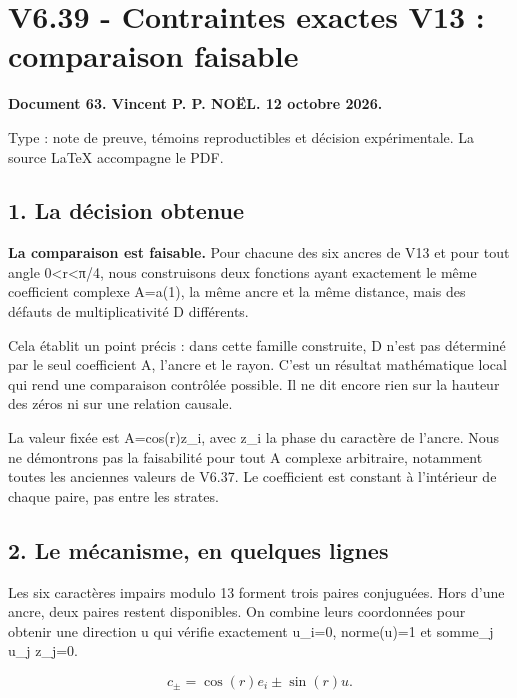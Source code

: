 \documentclass[
  10pt,
  a4paper,
]{article}
\author{}
\date{}
\begin{document}
\hypertarget{v6.39---contraintes-exactes-v13-comparaison-faisable}{%
\section{V6.39 - Contraintes exactes V13 : comparaison
faisable}\label{v6.39---contraintes-exactes-v13-comparaison-faisable}}

\textbf{Document 63. Vincent P. P. NOËL. 12 octobre 2026.}

Type : note de preuve, témoins reproductibles et décision expérimentale.
La source LaTeX accompagne le PDF.

\hypertarget{la-duxe9cision-obtenue}{%
\subsection{1. La décision obtenue}\label{la-duxe9cision-obtenue}}

\textbf{La comparaison est faisable.} Pour chacune des six ancres de V13
et pour tout angle 0\textless r\textless π/4, nous construisons deux
fonctions ayant exactement le même coefficient complexe A=a(1), la même
ancre et la même distance, mais des défauts de multiplicativité D
différents.

Cela établit un point précis : dans cette famille construite, D n'est
pas déterminé par le seul coefficient A, l'ancre et le rayon. C'est un
résultat mathématique local qui rend une comparaison contrôlée possible.
Il ne dit encore rien sur la hauteur des zéros ni sur une relation
causale.

La valeur fixée est A=cos(r)z\_i, avec z\_i la phase du caractère de
l'ancre. Nous ne démontrons pas la faisabilité pour tout A complexe
arbitraire, notamment toutes les anciennes valeurs de V6.37. Le
coefficient est constant à l'intérieur de chaque paire, pas entre les
strates.

\hypertarget{le-muxe9canisme-en-quelques-lignes}{%
\subsection{2. Le mécanisme, en quelques
lignes}\label{le-muxe9canisme-en-quelques-lignes}}

Les six caractères impairs modulo 13 forment trois paires conjuguées.
Hors d'une ancre, deux paires restent disponibles. On combine leurs
coordonnées pour obtenir une direction u qui vérifie exactement u\_i=0,
norme(u)=1 et somme\_j u\_j z\_j=0.

\[c_\pm=\cos(r)e_i\pm\sin(r)u.\]
\end{document}
